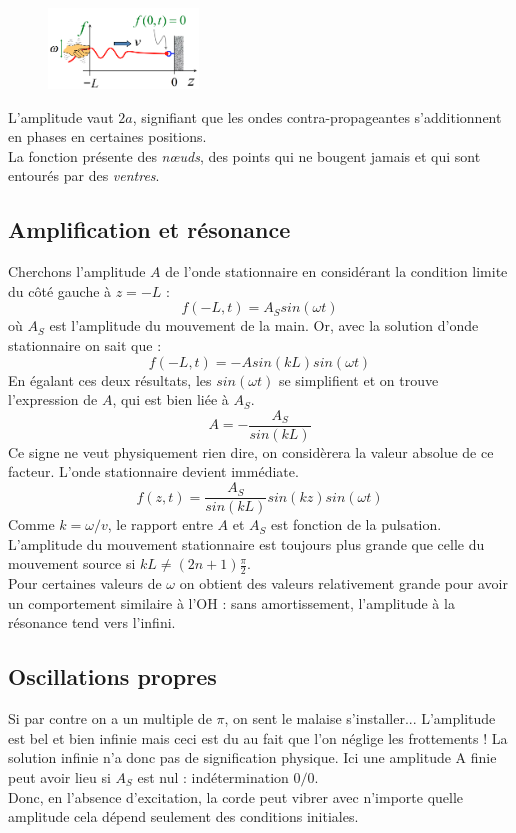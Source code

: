 \documentclass	[11pt, a4paper, openany]{book}
\begin{document}
\begin{figure}
\includegraphics[width=4cm]{oo/image37.png}
\end{figure}
L'amplitude vaut $2a$, signifiant que les ondes contra-propageantes s'additionnent en phases en certaines positions.\\
La fonction présente des \textit{nœuds}, des points qui ne bougent jamais et qui sont entourés par des \textit{ventres}.

\subsection{Amplification et résonance}
Cherchons l'amplitude $A$ de l'onde stationnaire en considérant la condition limite du côté gauche à $z = -L$ : 
\begin{equation}
f(-L, t) = A_S sin(\omega t)
\end{equation}
où $A_S$ est l'amplitude du mouvement de la main. Or, avec la solution d'onde stationnaire on sait que : 
\begin{equation}
f(-L, t) = -A sin(kL)sin(\omega t)
\end{equation}
En égalant ces deux résultats, les $sin(\omega t)$ se simplifient et on trouve l'expression de $A$, qui est bien liée à $A_S$.
\begin{equation}
A = -\frac{A_S}{sin(kL)}
\end{equation}
Ce signe ne veut physiquement rien dire, on considèrera la valeur absolue de ce facteur. L'onde stationnaire devient immédiate.
\begin{equation}
f(z, t) = \frac{A_S}{sin(kL)}sin(kz)sin(\omega t)
\end{equation}
Comme $k = \omega / v$, le rapport entre $A$ et $A_S$ est fonction de la pulsation. L'amplitude du mouvement stationnaire est toujours plus grande que celle du mouvement source si $kL \neq (2n + 1)\frac{\pi}{2}$.\\
Pour certaines valeurs de $\omega$ on obtient des valeurs relativement grande pour avoir un comportement similaire à l'OH : sans amortissement, l'amplitude à la résonance tend vers l'infini.

\subsection{Oscillations propres}
Si par contre on a un multiple de $\pi$, on sent le malaise s'installer... L'amplitude est bel et bien infinie mais ceci est du au fait que l'on néglige les frottements ! La solution infinie n'a donc pas de signification physique. Ici une amplitude A finie peut avoir lieu si $A_S$ est nul : indétermination $0/0$.\\
Donc, en l'absence d'excitation, la corde peut vibrer avec n'importe quelle amplitude cela dépend seulement des conditions initiales.\\
\end{document}
